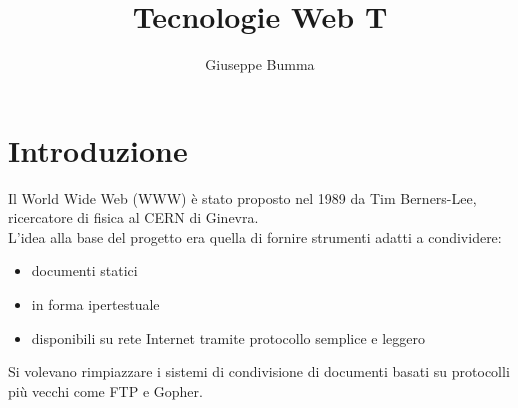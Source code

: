 \documentclass{article}
\title{Tecnologie Web T}
\author{Giuseppe Bumma}
\begin{document}
\newcommand{\R}{\mathbb{R}}
\newcommand{\Varepsilon}{\mathcal{E}}
\newcommand{\rad}{\text{rad}}
\newcommand{\bb}[1]{\mathbb{#1}}
\newcommand{\cc}[1]{\mathcal{#1}}
\newcommand{ \lognormal }{\text{Lognormal} }
\newcommand{\T}[1]{\text{#1}}
\newcommand*\circled[1]{\tikz[baseline=(char.base)]{%
            \node[shape=circle,draw,inner sep=2pt] (char) {#1};}}


\tableofcontents

\maketitle

\section{Introduzione}
Il World Wide Web (WWW) è stato proposto nel 1989 da Tim
Berners-Lee, ricercatore di fisica al CERN di Ginevra.\\
L'idea alla base del progetto era quella di fornire
strumenti adatti a condividere:
\begin{itemize}
    \item documenti statici
    \item in forma ipertestuale
    \item disponibili su rete Internet tramite protocollo
    semplice e leggero
\end{itemize}
Si volevano rimpiazzare i sistemi di condivisione di documenti basati su protocolli più vecchi come FTP e Gopher.
\end{document}
